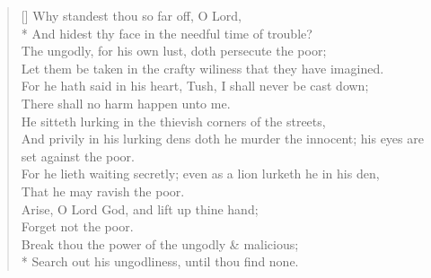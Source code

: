 \documentclass[MAIN]{subfiles}
\begin{document}
\settowidth{\versewidth}{The ungodly, for his own lust, doth persecute the poor;}
\begin{verse}[\versewidth]
Why standest thou so far off, O Lord,\\*
\vin And hidest thy face in the needful time of trouble?\\
The ungodly, for his own lust, doth persecute the poor;\\
\vin Let them be taken in the crafty wiliness that they have imagined.\\
For he hath said in his heart, Tush, I shall never be cast down;\\
\vin There shall no harm happen unto me.\\
He sitteth lurking in the thievish corners of the streets,\\
\vin And privily in his lurking dens doth he murder the innocent; his eyes are set against the poor.\\
For he lieth waiting secretly; even as a lion lurketh he in his den,\\
\vin That he may ravish the poor.\\
Arise, O Lord God, and lift up thine hand;\\
\vin Forget not the poor.\\
Break thou the power of the ungodly \& malicious;\\*
\vin Search out his ungodliness, until thou find none.
\end{verse}
\end{document}
